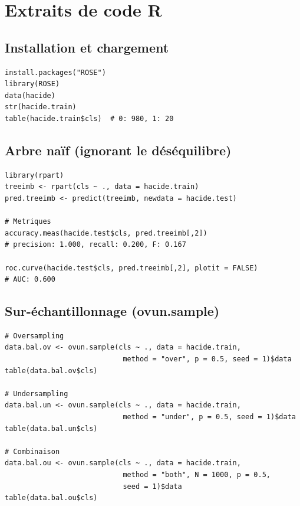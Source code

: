 \documentclass[a4paper,11pt]{article}
\theoremstyle{definition}
\begin{document}
\newpage
\section{Extraits de code R}

\subsection{Installation et chargement}

\begin{lstlisting}
install.packages("ROSE")
library(ROSE)
data(hacide)
str(hacide.train)
table(hacide.train$cls)  # 0: 980, 1: 20
\end{lstlisting}

\subsection{Arbre na\"if (ignorant le d\'es\'equilibre)}

\begin{lstlisting}
library(rpart)
treeimb <- rpart(cls ~ ., data = hacide.train)
pred.treeimb <- predict(treeimb, newdata = hacide.test)

# Metriques
accuracy.meas(hacide.test$cls, pred.treeimb[,2])
# precision: 1.000, recall: 0.200, F: 0.167

roc.curve(hacide.test$cls, pred.treeimb[,2], plotit = FALSE)
# AUC: 0.600
\end{lstlisting}

\subsection{Sur-\'echantillonnage (ovun.sample)}

\begin{lstlisting}
# Oversampling
data.bal.ov <- ovun.sample(cls ~ ., data = hacide.train,
                            method = "over", p = 0.5, seed = 1)$data
table(data.bal.ov$cls)

# Undersampling
data.bal.un <- ovun.sample(cls ~ ., data = hacide.train,
                            method = "under", p = 0.5, seed = 1)$data
table(data.bal.un$cls)

# Combinaison
data.bal.ou <- ovun.sample(cls ~ ., data = hacide.train,
                            method = "both", N = 1000, p = 0.5,
                            seed = 1)$data
table(data.bal.ou$cls)
\end{lstlisting}
\end{document}
